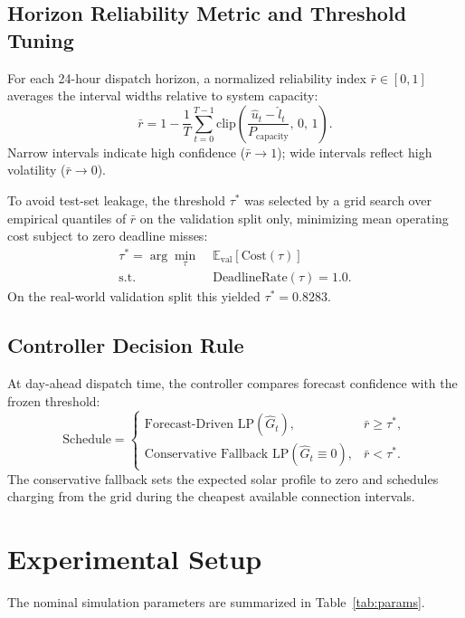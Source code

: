 \documentclass[conference]{IEEEtran}
\begin{document}
\subsection{Horizon Reliability Metric and Threshold Tuning}
For each 24-hour dispatch horizon, a normalized reliability index $\bar{r} \in [0, 1]$ averages the interval widths relative to system capacity:
\begin{equation}
\bar{r} = 1 - \frac{1}{T}\sum_{t=0}^{T-1} \text{clip}\!\left(\frac{\hat{u}_t - \hat{l}_t}{P_{\text{capacity}}},\, 0,\, 1\right).
\end{equation}
Narrow intervals indicate high confidence ($\bar{r} \to 1$); wide intervals reflect high volatility ($\bar{r} \to 0$).

To avoid test-set leakage, the threshold $\tau^*$ was selected by a grid search over empirical quantiles of $\bar{r}$ on the validation split only, minimizing mean operating cost subject to zero deadline misses:
\begin{equation}
\begin{split}
\tau^* = \arg\min_{\tau}\; & \mathbb{E}_{\text{val}}[\text{Cost}(\tau)] \\
\text{s.t.}\;\; & \text{DeadlineRate}(\tau) = 1.0.
\end{split}
\end{equation}
On the real-world validation split this yielded $\tau^* = 0.8283$.

\subsection{Controller Decision Rule}
At day-ahead dispatch time, the controller compares forecast confidence with the frozen threshold:
\begin{equation}
\text{Schedule} =
\begin{cases}
\text{Forecast-Driven LP}(\hat{G}_t), & \bar{r} \ge \tau^*, \\
\text{Conservative Fallback LP}(\hat{G}_t \equiv 0), & \bar{r} < \tau^*.
\end{cases}
\end{equation}
The conservative fallback sets the expected solar profile to zero and schedules charging from the grid during the cheapest available connection intervals.

\section{Experimental Setup}
The nominal simulation parameters are summarized in Table~\ref{tab:params}.
\end{document}

